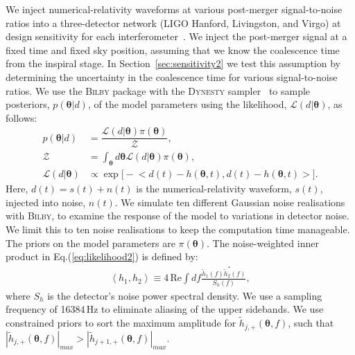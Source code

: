 \documentclass[../Thesis.tex]{subfiles}
\begin{document}
        We inject numerical-relativity waveforms at various post-merger signal-to-noise ratios into a three-detector network (LIGO Hanford, Livingston, and Virgo) at design sensitivity for each interferometer~\cite{PSD:aLIGO,PSD:aVirgo}. 
        We inject the post-merger signal at a fixed time and fixed sky position, assuming that we know the coalescence time from the inspiral stage. 
        In Section~\ref{sec:sensitivity2} we test this assumption by determining the uncertainty in the coalescence time for various signal-to-noise ratios.
        We use the {\textsc{Bilby}} package  \cite{Ashton2019} with the {\textsc{Dynesty}} sampler~\cite{Speagle2019} to sample posteriors, $p(\boldsymbol{\theta}|d)$, of the model parameters  using the likelihood, $\mathcal{L}(d | \boldsymbol{\theta})$, as follows:
        \begin{align}
        	p(\boldsymbol{\theta}|d) & =\dfrac{\mathcal{L}(d | \boldsymbol{\theta})\pi(\boldsymbol{\theta})}{\mathcal{Z}},\label{eq:posterior2}\\
        	\mathcal{Z} & =\int_{\boldsymbol{\theta}} d\boldsymbol{\theta} \mathcal{L}(d | \boldsymbol{\theta})\pi(\boldsymbol{\theta}),\label{eq:evidence2}\\
        	\mathcal{L}(d | \boldsymbol{\theta}) & \propto \exp\Big[-\Big<d(t)-h(\boldsymbol{\theta},t),d(t)-h(\boldsymbol{\theta},t)\Big>\Big]\label{eq:likelihood2}. 
        \end{align}        
        Here, $d(t)=s(t)+n(t)$ is the numerical-relativity waveform, $s(t)$, injected into noise, $n(t)$. 
        We simulate ten different Gaussian noise realisations with {\textsc{Bilby}}, to examine the response of the model to variations in detector noise. 
        We limit this to ten noise realisations to keep the computation time manageable.
        The priors on the model parameters are $\pi(\boldsymbol{\theta})$. 
        The noise-weighted inner product in Eq.(\ref{eq:likelihood2}) is defined by:
        \begin{align}
        	\left<h_1,h_2\right>\equiv4\, \mathrm{Re} \int df\frac{\tilde{h}_1(f)\tilde{h}^{*}_2(f)}{S_h(f)},\label{eq:inner_product2}
        \end{align}
    where $S_h$ is the detector's noise power spectral density.
    We use a sampling frequency of 16384\,Hz to eliminate aliasing of the upper sidebands. 
    We use constrained priors to sort the maximum amplitude for $\tilde{h}_{j,+}(\boldsymbol{\theta},f)$, such that  $|\tilde{h}_{j,+}(\boldsymbol{\theta},f)|_{max} > |\tilde{h}_{j+1,+}(\boldsymbol{\theta},f)|_{max}$.
\end{document}

